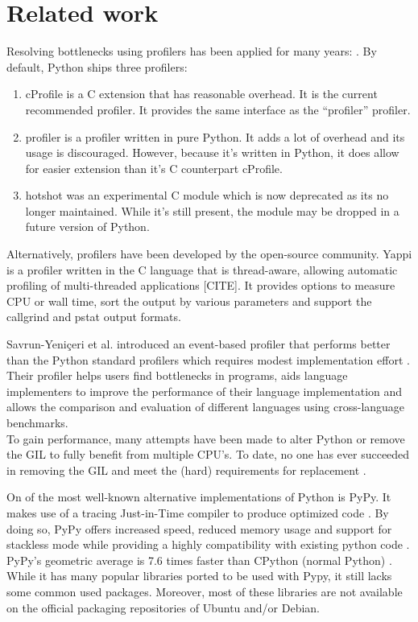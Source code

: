 \chapter{Related work}

Resolving bottlenecks using profilers has been applied for many years: \cite{pesterev2010locating, gorelick2014high, fan2013performance}.
By default, Python ships three profilers:

\begin{enumerate}
	\item cProfile is a C extension that has reasonable overhead. It is the current recommended profiler. It provides the same interface as the ``profiler'' profiler.
	\item profiler is a profiler written in pure Python. It adds a lot of overhead and its usage is discouraged. However, because it's written in Python, it does allow for easier extension than it's C counterpart cProfile.
	\item hotshot was an experimental C module which is now deprecated as its no longer maintained. While it's still present, the module may be dropped in a future version of Python.
\end{enumerate}

Alternatively, profilers have been developed by the open-source community.
Yappi is a profiler written in the C language that is thread-aware, allowing automatic profiling of multi-threaded applications [CITE].
It provides options to measure CPU or wall time, sort the output by various parameters and support the callgrind and pstat output formats.

Savrun-Yeni{\c{c}}eri et al. introduced an event-based profiler that performs better than the Python standard profilers which requires modest implementation effort \cite{savrun2015efficient}.
Their profiler helps users find bottlenecks in programs, aids language implementers to improve the performance of their language implementation and allows the comparison and evaluation of different languages using cross-language benchmarks.\\

To gain performance, many attempts have been made to alter Python or remove the GIL to fully benefit from multiple CPU's.
To date, no one has ever succeeded in removing the GIL and meet the (hard) requirements for replacement \cite{python2015global}.

On of the most well-known alternative implementations of Python is PyPy.
It makes use of a tracing Just-in-Time compiler to produce optimized code \cite{bolz2009tracing}.
By doing so, PyPy offers increased speed, reduced memory usage and support for stackless mode while providing a highly compatibility with existing python code \cite{pypy2016pypy}.
PyPy's geometric average is 7.6 times faster than CPython (normal Python) \cite{pypy2016speed}.
While it has many popular libraries ported to be used with Pypy, it still lacks some common used packages.
Moreover, most of these libraries are not available on the official packaging repositories of Ubuntu and/or Debian.

